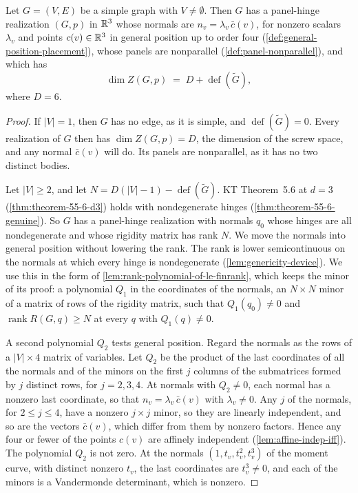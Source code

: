 \begin{lemma}[KT Theorem~5.6 at $d = 3$ with poles in general position]
  \label{lem:theorem-56-general-position}
  \leanok
  Let $G = (V, E)$ be a simple graph with $V \neq \emptyset$. Then $G$ has
  a panel-hinge realization $(G, p)$ in ${\mathbb{R}}^3$ whose normals are
  $n_v = \lambda_v\, \bar c(v)$, for nonzero scalars $\lambda_v$ and
  points $c(v) \in {\mathbb{R}}^3$ in general position up to order four
  (\cref{def:general-position-placement}), whose panels are nonparallel
  (\cref{def:panel-nonparallel}), and which has
  \[
    \dim Z(G, p) \;=\; D + \operatorname{def}(\tilde G),
  \]
  where $D = 6$.
\end{lemma}
\begin{proof}
  \leanok
  If $|V| = 1$, then $G$ has no edge, as it is simple, and
  $\operatorname{def}(\tilde G) = 0$. Every realization of $G$ then has
  $\dim Z(G, p) = D$, the dimension of the screw space, and any normal
  $\bar c(v)$ will do. Its panels are nonparallel, as it has no two
  distinct bodies.

  Let $|V| \ge 2$, and let $N = D(|V| - 1) - \operatorname{def}(\tilde G)$.
  KT Theorem~5.6 at $d = 3$ (\cref{thm:theorem-55-6-d3}) holds with
  nondegenerate hinges (\cref{thm:theorem-55-6-genuine}). So $G$ has a
  panel-hinge realization with normals $q_0$ whose hinges are all
  nondegenerate and whose rigidity matrix has rank $N$. We move the
  normals into general position without lowering the rank. The rank is
  lower semicontinuous on the normals at which every hinge is
  nondegenerate (\cref{lem:genericity-device}). We use this in the form
  of \cref{lem:rank-polynomial-of-le-finrank}, which keeps the minor of
  its proof: a polynomial $Q_1$ in the coordinates of the normals, an
  $N \times N$ minor of a matrix of rows of the rigidity matrix, such that
  $Q_1(q_0) \neq 0$ and $\operatorname{rank} R(G, q) \ge N$ at every $q$
  with $Q_1(q) \neq 0$.

  A second polynomial $Q_2$ tests general position. Regard the normals as
  the rows of a $|V| \times 4$ matrix of variables. Let $Q_2$ be the
  product of the last coordinates of all the normals and of the minors
  on the first $j$ columns of the submatrices formed by $j$ distinct
  rows, for $j = 2, 3, 4$. At normals with $Q_2 \neq 0$, each normal has
  a nonzero last coordinate, so that $n_v = \lambda_v\, \bar c(v)$ with
  $\lambda_v \neq 0$. Any $j$ of the normals, for $2 \le j \le 4$, have a
  nonzero $j \times j$ minor, so they are linearly independent, and so are
  the vectors $\bar c(v)$, which differ from them by nonzero factors. Hence any four
  or fewer of the points $c(v)$ are affinely independent
  (\cref{lem:affine-indep-iff}). The polynomial $Q_2$ is not zero. At the
  normals $(1, t_v, t_v^2, t_v^3)$ of the moment curve, with distinct
  nonzero $t_v$, the last coordinates are $t_v^3 \neq 0$, and each of the
  minors is a Vandermonde determinant, which is nonzero.


\end{proof}
